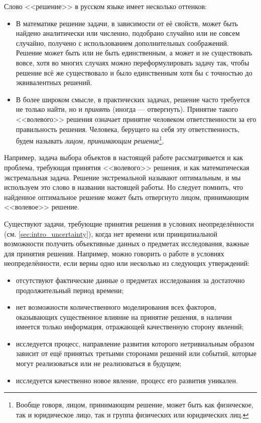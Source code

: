 Слово <<решение>> в русском языке имеет несколько оттенков: 
\begin{itemize}
  \item В математике решение задачи, в зависимости от её свойств, может быть найдено аналитически или численно, подобрано случайно или не совсем случайно, получено с использованием дополнительных соображений. Решение может быть или не быть единственным, а может и не существовать вовсе,  хотя во многих случаях можно переформулировать задачу так, чтобы решение всё же существовало и было единственным хотя бы с точностью до эквивалентных решений. 
  \item В более широком смысле, в практических задачах, решение часто требуется не только найти, но и {\sl принять} (иногда --- отвергнуть). Принятие такого <<волевого>> решения означает принятие человеком ответственности за его правильность решения. Человека, берущего на себя эту ответственность, будем называть {\sl лицом, принимающим решение}\footnote{Вообще говоря, лицом, принимающим решение, может быть как физическое, так и юридическое лицо, так и группа физических или юридических лиц.}. 
\end{itemize}
Например, задача выбора объектов в настоящей работе рассматривается и как проблема, требующая принятия <<волевого>> решения, и как математическая экстремальная задача. Решение экстремальной называют оптимальным, и мы используем это слово в названии настоящей работы. Но следует помнить, что найденное оптимальное решение может быть отвергнуто лицом, принимающим <<волевое>> решение.

Существуют задачи, требующие принятия решения в условиях неопределённости (см. \ref{sec:intro_uncertainty}), когда нет времени или принципиальной возможности получить объективные данных о предметах исследования, важные для принятия решения. Например, можно говорить о работе в условиях неопределённости, если верны одно или несколько из следующих утверждений:
\begin{itemize}
 \item отсутствуют фактические данные о предметах исследования за достаточно продолжительный период времени; 
 \item нет возможности количественного моделирования всех факторов, оказывающих существенное влияние на принятие решения, в наличии имеется только информация, отражающей качественную сторону явлений; 
 \item исследуется процесс, направление развития которого нетривиальным образом зависит от ещё принятых третьими сторонами решений или событий, которые могут реализоваться или не реализоваться в будущем;
 \item исследуется качественно новое явление, процесс его развития уникален.
\end{itemize}

